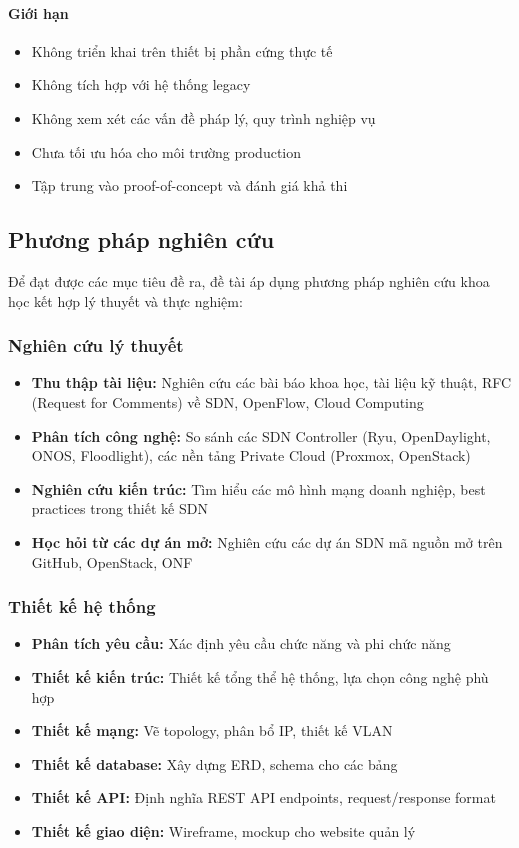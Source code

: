 \paragraph{Giới hạn}
\begin{itemize}
    \item Không triển khai trên thiết bị phần cứng thực tế
    \item Không tích hợp với hệ thống legacy
    \item Không xem xét các vấn đề pháp lý, quy trình nghiệp vụ
    \item Chưa tối ưu hóa cho môi trường production
    \item Tập trung vào proof-of-concept và đánh giá khả thi
\end{itemize}

\subsection{Phương pháp nghiên cứu}

Để đạt được các mục tiêu đề ra, đề tài áp dụng phương pháp nghiên cứu khoa học kết hợp lý thuyết và thực nghiệm:

\subsubsection{Nghiên cứu lý thuyết}
\begin{itemize}
    \item \textbf{Thu thập tài liệu:} Nghiên cứu các bài báo khoa học, tài liệu kỹ thuật, RFC (Request for Comments) về SDN, OpenFlow, Cloud Computing
    \item \textbf{Phân tích công nghệ:} So sánh các SDN Controller (Ryu, OpenDaylight, ONOS, Floodlight), các nền tảng Private Cloud (Proxmox, OpenStack)
    \item \textbf{Nghiên cứu kiến trúc:} Tìm hiểu các mô hình mạng doanh nghiệp, best practices trong thiết kế SDN
    \item \textbf{Học hỏi từ các dự án mở:} Nghiên cứu các dự án SDN mã nguồn mở trên GitHub, OpenStack, ONF
\end{itemize}

\subsubsection{Thiết kế hệ thống}
\begin{itemize}
    \item \textbf{Phân tích yêu cầu:} Xác định yêu cầu chức năng và phi chức năng
    \item \textbf{Thiết kế kiến trúc:} Thiết kế tổng thể hệ thống, lựa chọn công nghệ phù hợp
    \item \textbf{Thiết kế mạng:} Vẽ topology, phân bổ IP, thiết kế VLAN
    \item \textbf{Thiết kế database:} Xây dựng ERD, schema cho các bảng
    \item \textbf{Thiết kế API:} Định nghĩa REST API endpoints, request/response format
    \item \textbf{Thiết kế giao diện:} Wireframe, mockup cho website quản lý
\end{itemize}

